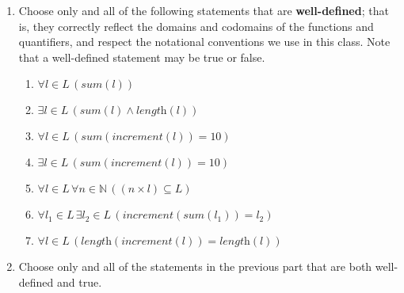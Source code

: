 \documentclass[12pt, oneside]{article}
\begin{document}
\begin{enumerate}
    \newpage
    \item Choose only and all of the following statements that are \textbf{well-defined}; that is, they correctly reflect the domains and codomains of the functions and quantifiers, and respect the notational conventions we use in this class. Note that a well-defined statement may be true or false.
    \begin{multicols}{2}    
    \begin{enumerate}
        \item $\forall l \in L \, (\textit{sum}(l))$
        \item $\exists l \in L \, (\textit{sum}(l) \land \textit{length}(l))$
        \item $\forall l \in L \, (\textit{sum}(\textit{increment}(l)) = 10)$
        \item $\exists l \in L \, (\textit{sum}(\textit{increment}(l)) = 10)$
        \item $\forall l \in L \, \forall n \in \mathbb{N} \, ((n \times l) \subseteq L)$
        \item $\forall l_1 \in L \, \exists l_2 \in L \, (\textit{increment}(\textit{sum}(l_1)) = l_2)$
        \item $\forall l \in L \, (\textit{length}(\textit{increment}(l)) = \textit{length}(l))$
    \end{enumerate}
    \end{multicols}
    
    \item Choose only and all of the statements in the previous part that are both well-defined and true.
\end{enumerate}
\end{document}

